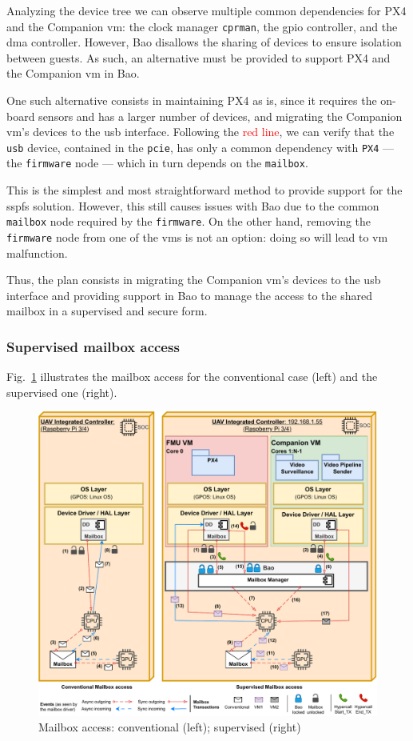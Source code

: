 Analyzing the device tree we can observe multiple common dependencies for PX4
and the Companion \gls{vm}: the clock manager \texttt{cprman}, the
\gls{gpio} controller, and the \gls{dma} controller. However, Bao disallows the
sharing of devices to ensure isolation between guests. As such, an alternative
must be provided to support PX4 and the Companion \gls{vm} in Bao.

One such alternative consists in maintaining PX4 as is, since it requires the
on-board sensors and has a larger number of devices, and migrating the Companion
\gls{vm}'s devices to the \gls{usb} interface. Following the
\textcolor{red}{red line}, we can verify that the \texttt{usb} device,
contained in the \texttt{pcie}, has only a common dependency with \texttt{PX4}
--- the \texttt{firmware} node --- which in turn depends on the
\texttt{mailbox}.

This is the simplest and most straightforward method to provide support for the
\gls{sspfs} solution. However, this still causes issues with Bao due to the
common \texttt{mailbox} node required by the \texttt{firmware}. On the other
hand, removing the \texttt{firmware} node from one of the \glspl{vm} is not an
option: doing so will lead to \gls{vm} malfunction.

Thus, the plan consists in migrating the Companion \gls{vm}'s devices to the
\gls{usb} interface and providing support in Bao to manage the access to the
shared mailbox in a supervised and secure form.

\subsubsection{Supervised mailbox access}
\label{sec:superv-mailb-access}
Fig.~\ref{fig:design-mailbox} illustrates the mailbox access for the
conventional case (left) and the supervised one (right).

\begin{figure}[!hbt]
  \centering
  \includegraphics[width=1.0\textwidth]{./img/pdf/uav-main-design-mailbox} 
  \caption{Mailbox access: conventional (left); supervised (right)}%
  \label{fig:design-mailbox}
\end{figure}

